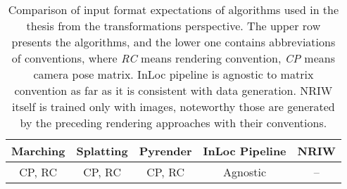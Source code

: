 \begin{table}
\caption[Comparison of input format expectations of algorithms used in the
thesis from the transformations perspective]{Comparison of input format
expectations of algorithms used in the
thesis from the transformations perspective. The upper row presents the algorithms, and
the lower one contains abbreviations of conventions, where \emph{RC} means rendering
convention, \emph{CP} means camera pose matrix. InLoc pipeline is agnostic to matrix
convention as far as it is consistent with data generation. NRIW itself is trained only
with images, noteworthy those are generated by the preceding rendering approaches with
their conventions.}
\centering
    \begin{tabular}{c c c c c}
    \toprule
    Marching & Splatting & Pyrender & InLoc Pipeline & NRIW\\
    \midrule
    CP, RC & CP, RC & CP, RC & Agnostic & -- \\
    \bottomrule
    \end{tabular}
\label{tab:agorithm_conventions}
\end{table}
